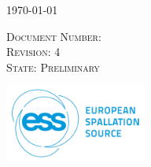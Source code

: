 \documentclass[12pt]{article}
\begin{document}
\begin{titlepage}


\vspace{7mm}
\begin{center}
{\large \today}
\end{center}
 \textsc{\small Document Number: }\\
 \textsc{\small Revision: 4}\\
  \textsc{\small State: Preliminary}\\
\vspace{21 mm}
\newcommand*{\plogo}{\includegraphics[width=0.35\textwidth]{ESS_logo.png}}

\plogo\\[1cm] %
 

\vfill %



\pagebreak
\newpage


\end{titlepage}
\end{document}
